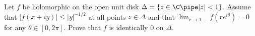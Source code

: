 Let $f$ be holomorphic on the open unit disk
$\Delta=\{z\in\C \pipe |z|<1\}$.  Assume that $|f(x+iy)|\leq |y|^{-1/2}$ at
all points $z\in \Delta$ and that $\lim_{r\rightarrow
1-}f(re^{i\theta})=0$ for any $\theta\in [0,2\pi]$. Prove that $f$ is
identically $0$ on $\Delta$.
